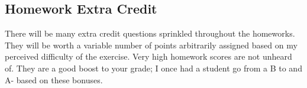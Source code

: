 \subsection*{Homework Extra Credit}

There will be many extra credit questions sprinkled throughout the homeworks. They will be worth a variable number of points arbitrarily assigned based on my perceived difficulty of the exercise. Very high homework scores are not unheard of. They are a good boost to your grade; I once had a student go from a B to and A- based on these bonuses.